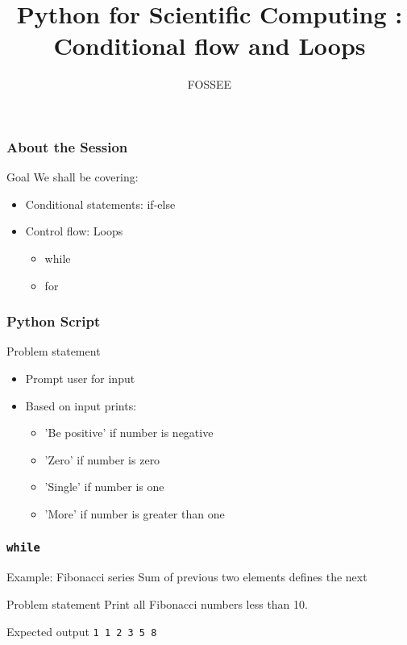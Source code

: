 \documentclass[14pt,compress]{beamer}
\title{Python for Scientific Computing : Conditional flow and Loops}
\author[FOSSEE] {FOSSEE}
\institute[IIT Bombay] {Department of Aerospace Engineering\\IIT Bombay}
\date{}
\newcommand{\typ}[1]{\lstinline{#1}}
\begin{document}
\begin{frame}
  \maketitle
\end{frame}

\begin{frame}
  \frametitle{About the Session}
  \begin{block}{Goal}
    We shall be covering:
    \begin{itemize}
    \item Conditional statements: if-else
    \item Control flow: Loops
      \begin{itemize}
      \item while
      \item for
      \end{itemize}
    \end{itemize}
  \end{block}
\end{frame}

\begin{frame}
  \frametitle{Python Script}
  \begin{block}{Problem statement}    
    \begin{itemize}
    \item Prompt user for input
    \item Based on input prints:
      \begin{itemize}
      \item 'Be positive' if number is negative
      \item 'Zero' if number is zero
      \item 'Single' if number is one
      \item 'More' if number is greater than one
      \end{itemize}
    \end{itemize}
  \end{block}
\end{frame}

\begin{frame}[fragile]
  \frametitle{\typ{while}}
\begin{block}{Example: Fibonacci series}
  Sum of previous two elements defines the next
\end{block}
\begin{block}{Problem statement}
  Print all Fibonacci numbers less than 10.
\end{block}
\begin{block}{Expected output}
\typ{1 1 2 3 5 8}\\  
\end{block}
\end{frame}
\end{document}

